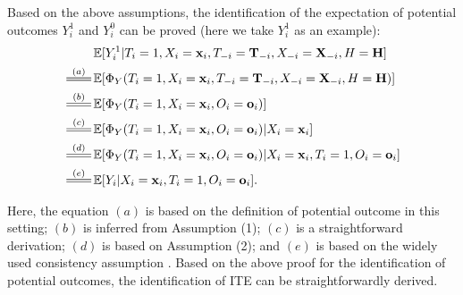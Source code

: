 Based on the above assumptions, the identification of the expectation of potential outcomes $Y_i^{1}$ and $Y_i^{0}$ can be proved (here we take $Y_i^{1}$ as an example):
{ 
\begin{align}
&\mathbb{E}[Y^{1}_i|T_i=1, X_i=\mathbf{x}_i, T_{-i}=\mathbf{T}_{-i},{X}_{-i}=\mathbf{X}_{-i},H=\mathbf{H}] \\
\overset{(a)}{\longeq}&\mathbb{E}[\Phi_Y(T_i=1, X_i=\mathbf{x}_i, T_{-i}=\mathbf{T}_{-i},{X}_{-i}=\mathbf{X}_{-i},H=\mathbf{H})] \\\overset{(b)}{\longeq}& \mathbb{E}[\Phi_Y(T_i=1, X_i=\mathbf{x}_i, O_i=\mathbf{o}_i)] \\
\overset{(c)}{\longeq} &\mathbb{E}[\Phi_Y(T_i=1, X_i=\mathbf{x}_i, O_i=\mathbf{o}_i)|X_i=\mathbf{x}_i] \\
\overset{(d)}{\longeq} &\mathbb{E}[\Phi_Y(T_i=1, X_i=\mathbf{x}_i, O_i=\mathbf{o}_i)|X_i=\mathbf{x}_i, T_i=1,O_i=\mathbf{o}_i] \\
\overset{(e)}{\longeq} &\mathbb{E}[Y_i|X_i=\mathbf{x}_i, T_i=1,O_i=\mathbf{o}_i].
\end{align}
}

Here, the equation $(a)$ is based on the definition of potential outcome in this setting; $(b)$ is inferred from Assumption (1); $(c)$ is a straightforward derivation; $(d)$ is based on Assumption (2); and $(e)$ is based on the widely used consistency assumption \cite{rubin1980randomization}. Based on the above proof for the identification of potential outcomes, the identification of ITE can be straightforwardly derived.

